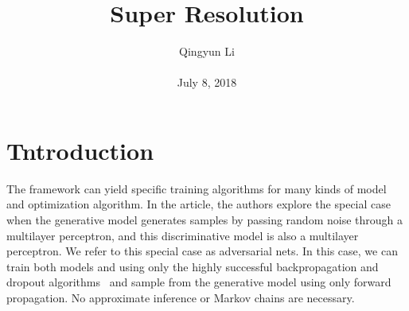 \documentclass[10pt,twocolumn,letterpaper]{article}
\begin{document}
\author{Qingyun Li\\\\
July 8, 2018}        
\title{Super Resolution}

\maketitle

\section{Tntroduction}
\par The  framework can yield specific training algorithms for many kinds of model and optimization algorithm. In the article, the authors explore the special case when the generative model generates samples by passing random noise through a multilayer perceptron, and this discriminative model is also a multilayer perceptron. We refer to this special case as adversarial nets. In this case, we can train both models and using only the highly successful backpropagation and dropout algorithms~\cite{Hinton2012Improving} and sample from the generative model using only forward propagation. No approximate inference or Markov chains are necessary.
\end{document}

